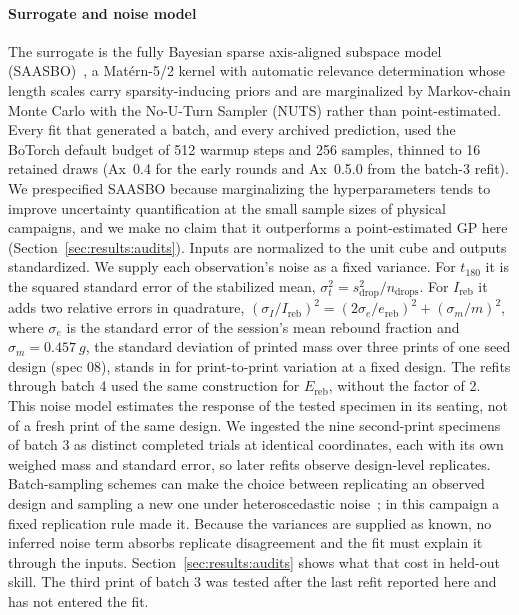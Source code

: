\documentclass[lineno,nocopyright,upint,varvw,hyphenate]{asmejour}
\begin{document}
\paragraph{Surrogate and noise model} The surrogate is the fully
Bayesian sparse axis-aligned subspace model
(SAASBO)~\citep{eriksson2021saasbo}, a Mat\'ern-5/2 kernel with automatic
relevance determination whose length scales carry sparsity-inducing
priors and are marginalized by Markov-chain Monte Carlo with the
No-U-Turn Sampler (NUTS) rather than point-estimated. Every fit that
generated a batch, and every archived prediction, used the BoTorch
default budget of 512 warmup steps and 256 samples, thinned to 16
retained draws (Ax~0.4 for the early rounds and Ax~0.5.0 from the
batch-3 refit). We prespecified SAASBO because marginalizing the
hyperparameters tends to improve uncertainty quantification at the small
sample sizes of physical campaigns, and we make no claim that it
outperforms a point-estimated GP here (Section~\ref{sec:results:audits}).
Inputs are normalized to the unit cube and outputs standardized. We
supply each observation's noise as a fixed variance. For $t_{180}$ it is
the squared standard error of the stabilized mean,
$\sigma_t^2 = s_{\mathrm{drop}}^2 / n_{\mathrm{drops}}$. For
$I_{\mathrm{reb}}$ it adds two relative errors in quadrature,
$(\sigma_I/I_{\mathrm{reb}})^2 = (2\sigma_e/e_{\mathrm{reb}})^2 +
(\sigma_m/m)^2$, where $\sigma_e$ is the standard error of the session's
mean rebound fraction and $\sigma_m = \SI{0.457}{g}$, the standard
deviation of printed mass over three prints of one seed design (spec 08),
stands in for print-to-print variation at a fixed design. The refits
through batch 4 used the same construction for $E_{\mathrm{reb}}$,
without the factor of 2. This noise model estimates the response of the
tested specimen in its seating, not of a fresh print of the same design.
We ingested the nine second-print specimens of batch 3 as distinct
completed trials at identical coordinates, each with its own weighed mass
and standard error, so later refits observe design-level replicates.
Batch-sampling schemes can make the choice between replicating an
observed design and sampling a new one under heteroscedastic
noise~\citep{vanbeek2021batchnoise}; in this campaign a fixed replication
rule made it.
Because the variances are supplied as known, no inferred noise term
absorbs replicate disagreement and the fit must explain it through the
inputs. Section~\ref{sec:results:audits} shows what that cost in
held-out skill. The third print of batch 3 was tested after the last
refit reported here and has not entered the fit.
\end{document}
